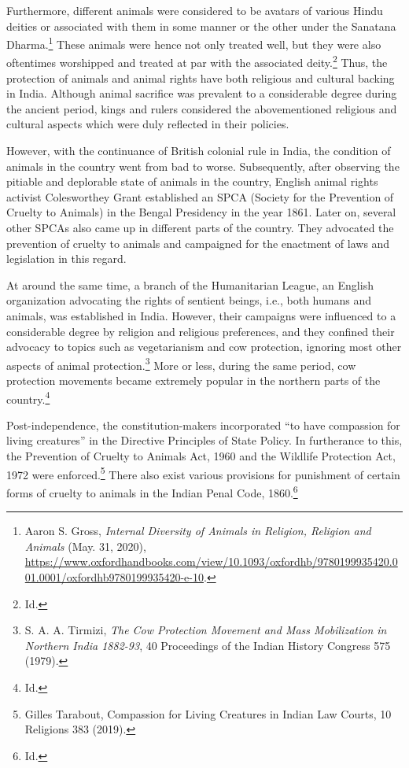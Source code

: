 \begin{multicols}{2}
\noi
Furthermore, different animals were considered to be avatars of various Hindu deities or
associated with them in some manner or the other under the Sanatana Dharma.\footnote{Aaron S. Gross, \textit{Internal Diversity of Animals in Religion, Religion and Animals} (May. 31, 2020), \url{https://www.oxfordhandbooks.com/view/10.1093/oxfordhb/9780199935420.001.0001/oxfordhb9780199935420-e-10}. } These
animals were hence not only treated well, but they were also oftentimes worshipped and
treated at par with the associated deity.\footnote{Id.} Thus, the protection of animals and animal rights
have both religious and cultural backing in India. Although animal sacrifice was prevalent to
a considerable degree during the ancient period, kings and rulers considered the abovementioned religious and cultural aspects which were duly reflected in their policies. 

\noi
However, with the continuance of British colonial rule in India, the condition of animals in
the country went from bad to worse. Subsequently, after observing the pitiable and deplorable
state of animals in the country, English animal rights activist Colesworthey Grant established
an SPCA (Society for the Prevention of Cruelty to Animals) in the Bengal Presidency in the
year 1861. Later on, several other SPCAs also came up in different parts of the country. They
advocated the prevention of cruelty to animals and campaigned for the enactment of laws and
legislation in this regard. 

\noi
At around the same time, a branch of the Humanitarian League, an English organization
advocating the rights of sentient beings, i.e., both humans and animals, was established in
India. However, their campaigns were influenced to a considerable degree by religion and
religious preferences, and they confined their advocacy to topics such as vegetarianism and
cow protection, ignoring most other aspects of animal protection.\footnote{S. A. A. Tirmizi, \textit{The Cow Protection Movement and Mass Mobilization in Northern India 1882-93}, 40 Proceedings of the Indian History Congress 575 (1979).} More or less, during the
same period, cow protection movements became extremely popular in the northern parts of
the country.\footnote{Id.}

\noi
Post-independence, the constitution-makers incorporated “to have compassion for living
creatures” in the Directive Principles of State Policy. In furtherance to this, the Prevention of Cruelty to Animals Act, 1960 and the Wildlife Protection Act, 1972 were enforced.\footnote{Gilles Tarabout, Compassion for Living Creatures in Indian Law Courts, 10 Religions 383 (2019).} There
also exist various provisions for punishment of certain forms of cruelty to animals in the
Indian Penal Code, 1860.\footnote{Id.}



\end{multicols}
